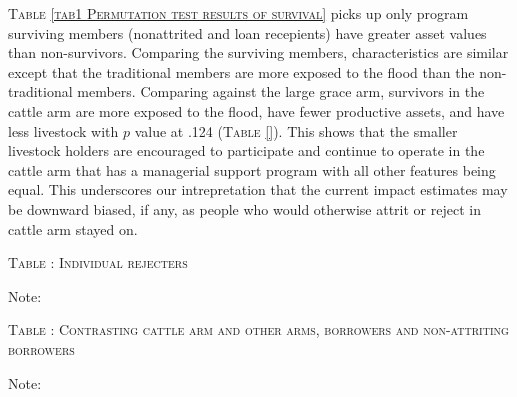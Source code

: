 	\textsc{\normalsize Table \ref{tab1 Permutation test results of survival}} picks up only program surviving members (nonattrited and loan recepients) have greater asset values than non-survivors. Comparing the surviving members, characteristics are similar except that the \textsf{traditional} members are more exposed to the flood than the non-\textsf{traditional} members. Comparing against the large grace arm, survivors in the cattle arm are more exposed to the flood, have fewer productive assets, and have less livestock with $p$ value at .124 (\textsc{\normalsize Table \ref{}}). This shows that the smaller livestock holders are encouraged to participate and continue to operate in the cattle arm that has a managerial support program with all other features being equal. This underscores our intrepretation that the current impact estimates may be downward biased, if any, as people who would otherwise attrit or reject in cattle arm stayed on.

\begin{table}
\hspace{-1cm}\begin{minipage}[t]{14cm}
\hfil\textsc{\normalsize Table \thetable: Individual rejecters\label{tab IRjecters}}\\
\setlength{\tabcolsep}{1pt}
\setlength{\baselineskip}{8pt}
\renewcommand{\arraystretch}{.55}

\vspace{2ex}
\end{minipage}

\footnotesize Note: \mpage{12cm}{\footnotesize }
\end{table}

\begin{table}
\hspace{-1cm}\begin{minipage}[t]{14cm}
\hfil\textsc{\normalsize Table \thetable: Contrasting \textsf{cattle} arm and other arms, borrowers and non-attriting borrowers\label{tab cownoncow}}\\
\setlength{\tabcolsep}{1pt}
\setlength{\baselineskip}{8pt}
\renewcommand{\arraystretch}{.55}

\vspace{2ex}
\end{minipage}

\footnotesize Note: \mpage{12cm}{\footnotesize }
\end{table}



